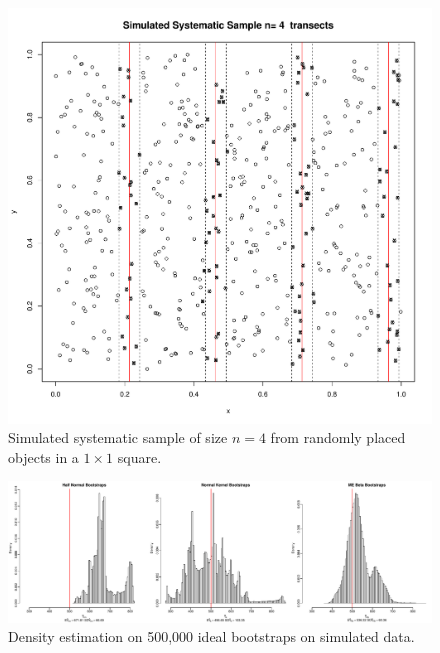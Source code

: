 \documentclass[12pt]{amsart}
\begin{document}
\clearpage
\begin{figure}[h]
  \begin{center}
    \includegraphics[width=.75\textwidth]{../simulated_sample.pdf}
    \caption{Simulated systematic sample of size $n=4$ from randomly placed objects in a $1\times 1$ square.}
    \label{sample}
  \end{center}
\end{figure}
\begin{figure}[h]
  \begin{center}
  \includegraphics[width=\textwidth]{../500K_bootstrap_comparison.pdf}
  \caption{Density estimation on 500,000 ideal bootstraps on simulated data.}
  \label{simulation_results}
  \end{center}
\end{figure}

\end{document}
